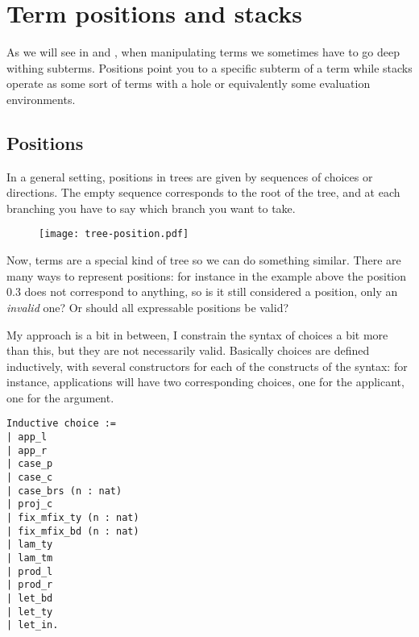 \chapter{Term positions and stacks}

As we will see in  and , when
manipulating terms we sometimes have to go deep withing subterms.
Positions point you to a specific subterm of a term while stacks operate as
some sort of terms with a hole or equivalently some evaluation environments.

\section{Positions}

In a general setting, positions in trees are given by sequences of choices or
directions. The empty sequence corresponds to the root of the tree, and at each
branching you have to say which branch you want to take.

\begin{figure}[hb]
  \texttt{[image: tree-position.pdf]}
\end{figure}

Now, terms are a special kind of tree so we can do something similar.
There are many ways to represent positions: for instance in the example above
the position \(0.3\) does not correspond to anything, so is it still considered
a position, only an \emph{invalid} one? Or should all expressable positions
be valid?

My approach is a bit in between, I constrain the syntax of choices a bit more
than this, but they are not necessarily valid.
Basically choices are defined inductively, with several constructors for each
of the constructs of the syntax: for instance, applications will have two
corresponding choices, one for the applicant, one for the argument.
\begin{verbatim}
Inductive choice :=
| app_l
| app_r
| case_p
| case_c
| case_brs (n : nat)
| proj_c
| fix_mfix_ty (n : nat)
| fix_mfix_bd (n : nat)
| lam_ty
| lam_tm
| prod_l
| prod_r
| let_bd
| let_ty
| let_in.
\end{verbatim}

